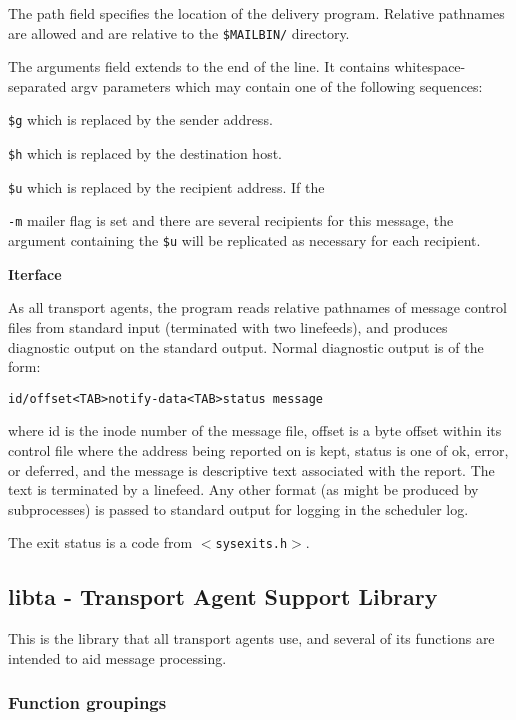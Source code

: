 The path field specifies the location of the delivery program. 
Relative pathnames are allowed and are relative to
the {\tt \$MAILBIN/} directory.

The arguments field extends to the end of the line. It
contains whitespace-separated argv parameters which may
contain one of the following sequences:

{\tt \$g} which is replaced by the sender address.

{\tt \$h} which is replaced by the destination host.

{\tt \$u} which is replaced by the recipient address. If the

{\tt -m} mailer flag is set and there are several recipients for this message, the argument containing the {\tt \$u} will be replicated as necessary for each recipient.

{\bf Iterface}

As all transport agents, the program reads relative pathnames 
of message control files from standard input (terminated 
with two linefeeds), and produces diagnostic output
on the standard output. Normal diagnostic output is of
the form:

\begin{verbatim}
id/offset<TAB>notify-data<TAB>status message
\end{verbatim}


where id is the inode number of the message file, offset
is a byte offset within its control file where the address
being reported on is kept, status is one of ok, error, or
deferred, and the message is descriptive text associated
with the report. The text is terminated by a linefeed.
Any other format (as might be produced by subprocesses) is
passed to standard output for logging in the scheduler
log.

The exit status is a code from {\tt {\(<\)}sysexits.h{\(>\)}}.




\subsection{libta - Transport Agent Support Library}


This is the library that all transport agents use, and several of its
functions are intended to aid message processing.


\subsubsection{Function groupings}


